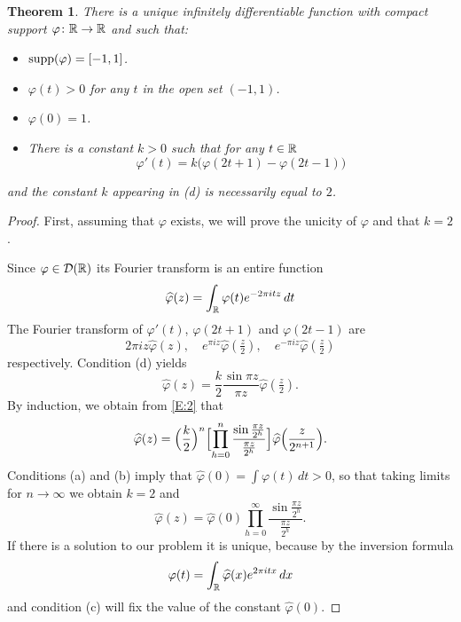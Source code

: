 \documentclass[10pt]{amsart}
\newtheorem{thm}{Theorem}
\theoremstyle{definition}
\theoremstyle{remark}
\begin{document}
\begin{thm}\label{T:1}
There is a unique  infinitely differentiable function with compact support $\varphi\colon\mathbb{R}\to\mathbb{R}$ and such that:
\begin{itemize}
\item[(a)] $\operatorname{supp}(\varphi)=[-1,1]$.
\item[(b)] $\varphi(t)>0$ for any $t$ in the open set $(-1,1)$.
\item[(c)] $\varphi(0)=1$.
\item[(d)] There is a constant $k>0$ such that for any $t\in\mathbb{R}$
\[
\varphi'(t)=k\bigl(\varphi(2t+1)-\varphi(2t-1)\bigr)
\]
\end{itemize}
and the constant $k$ appearing in (d) is necessarily equal to $2$.
\end{thm}
\begin{proof}
First, assuming that $\varphi$ exists, we will prove the unicity of $\varphi$ and that $k=2$.



Since $\varphi\in\mathcal D(\mathbb{R})$ its Fourier transform is an entire function
\begin{equation}\label{E:1}
\widehat\varphi(z)=\int_{\mathbb{R}} \varphi(t)e^{-2\pi i t z}\,dt
\end{equation}
The Fourier transform of  $\varphi'(t)$, $\varphi(2t+1)$ and $\varphi(2t-1)$ are
\[2\pi i z \widehat\varphi(z),\quad e^{\pi i z}\widehat\varphi(\tfrac{z}{2}), 
\quad e^{-\pi i z}\widehat\varphi(\tfrac{z}{2})\]
respectively. Condition (d) yields
\begin{equation}\label{E:2}
\widehat\varphi(z)=\frac{k}{2}\frac{\sin\pi z}{\pi z}\widehat\varphi(\tfrac{z}{2}).
\end{equation}
By induction, we obtain from \eqref{E:2} that
\begin{equation}\label{E:3}
\widehat\varphi(z)=\Bigl(\frac{k}{2}\Bigr)^n\Bigl[\prod_{h=0}^n \frac{\sin\frac{\pi z}{2^h}}
{\frac{\pi z}{2^h}}\Bigr]\widehat\varphi\Bigl(\frac{z}{2^{n+1}}\Bigr).
\end{equation}
Conditions (a) and (b) imply that $\widehat\varphi(0)=\int\varphi(t)\,dt>0$, so that 
taking limits for $n\to\infty$ we obtain $k=2$ and 
\begin{equation}\label{E:4}
\widehat\varphi(z)=\widehat\varphi(0)\prod_{h=0}^\infty \frac{\sin\frac{\pi z}{2^h}}
{\frac{\pi z}{2^h}}.
\end{equation}
If there is a solution to our problem it is unique, because by the inversion formula 
\begin{equation}\label{E:5}
\varphi(t)=\int_{\mathbb{R}}\widehat\varphi(x)e^{2\pi i t x}\,dx
\end{equation}
and condition (c) will fix the value of the constant $\widehat\varphi(0)$. 


\end{proof}
\end{document}
